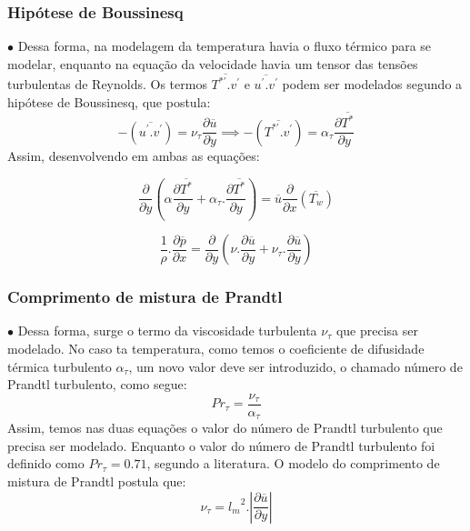 \documentclass[xcolor=dvipsnames,10pt,aspectratio=169]{beamer}
\begin{document}
		
		\begin{frame}
			\frametitle{Hipótese de Boussinesq}
			$\bullet$ Dessa forma, na modelagem da temperatura havia o fluxo térmico para se modelar, enquanto na equação da velocidade havia um tensor das tensões turbulentas de Reynolds. Os termos $\overline{T^{\ast\prime} . v^\prime}$ e $ \overline{u^\prime . v^\prime} $ podem ser modelados segundo a hipótese de Boussinesq, que postula:
			\begin{equation}\label{bou}
			-\left(\overline{ u^\prime . v^\prime}\right) = 
			\nu_\tau \frac{\partial{\overline{u}}}{\partial{y}}
			\implies
			-\left(\overline{ T^{\ast\prime} . v^\prime}\right) = 
			\alpha_\tau \frac{\partial{\overline{T^\ast}}}{\partial{y}}
			\end{equation}
			Assim, desenvolvendo em ambas as equações: 
			\\
			\begin{minipage}[h!]{0.45\textwidth}
				\begin{equation}\label{equation_var}
				{\frac{\partial{}}{\partial{y}}} \left(\alpha {\frac{\partial{\overline{T^\ast}}}{\partial{y}}}   
				+ \alpha_\tau . \frac{\partial \overline{T^\ast}}{\partial y} \right)
				= 
				\overline{u}\frac{\partial{}}{\partial{x}}\left(\overline{T_w}\right)  
				\end{equation}
			\end{minipage}\hfill
			\begin{minipage}[h!]{0.45\textwidth}
				\begin{equation}
				\frac{1}{\rho}. \frac{\partial \overline{p}}{\partial x} = \frac{\partial}{\partial y} \left( \nu . \frac{\partial \overline{u}}{\partial y} + \nu_\tau . \frac{\partial \overline{u}}{\partial y}\right)  
				\end{equation}
			\end{minipage}
		\end{frame}
	
	
	
	
		
		\begin{frame}
			\frametitle{Comprimento de mistura de Prandtl}
			$\bullet$ Dessa forma, surge o termo da viscosidade turbulenta $\nu_\tau$ que precisa ser modelado. No caso ta temperatura, como temos o coeficiente de difusidade térmica turbulento $\alpha_\tau$, um novo valor deve ser introduzido, o chamado número de Prandtl turbulento, como segue:
			\begin{equation}
				Pr_\tau = \frac{\nu_\tau}{\alpha_\tau}
			\end{equation} 
			Assim, temos nas duas equações o valor do número de Prandtl turbulento que precisa ser modelado. Enquanto o valor do número de Prandtl turbulento foi definido como $ Pr_\tau = 0.71$, segundo a literatura.
			O modelo do comprimento de mistura de Prandtl postula que:
			\begin{equation}
			\nu_\tau = {l_m}^2 . \left| \frac{\partial \overline{u}}{\partial y} \right|
			\end{equation}
		\end{frame}
	
\end{document}

